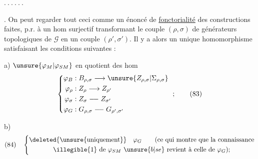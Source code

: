 \hfill $.\ .\ .\ .\ .\ .$ 


. On peut regarder tout ceci comme un énoncé de \uline{fonctorialité} des constructions faites, p.r. à un hom surjectif
transformant le couple $(\rho,\sigma)$ de générateurs topologiques de $\mathcal G$ en un couple $(\rho',\sigma')$.
Il y a alors un unique homomorphisme
satisfaisant les conditions suivantes :

a) $\unsure{\varphi_M|\varphi_{SM}}$  en quotient  des hom
\[
\left\{\begin{aligned}
\varphi_B&:B_{\rho,\sigma}\longrightarrow\unsure{Z_{\rho,\sigma}|\Sigma_{\rho,\sigma}}\\
\varphi_\rho&:Z_\rho\longrightarrow Z_{\rho'}\\
\varphi_\sigma&:Z_\sigma\mathrel{\relbar\joinrel\relbar} Z_{\sigma'}\\
\varphi_G&:G_{\rho,\sigma}\mathrel{\relbar\joinrel\relbar} G_{\rho',\sigma'}
\end{aligned}\right.\ ;\qquad(83)
\]

b) 
\[
(84)\quad\left\{\begin{gathered}
\deleted{\text{\unsure{uniquement}}}\quad\varphi_G\qquad
\text{(ce qui montre que la connaissance}\\
\text{\illegible{1} de }\varphi_{SM}\ \unsure{b|se}\ \text{revient à celle de }\varphi_G\text{)};
\end{gathered}\right.
\]

